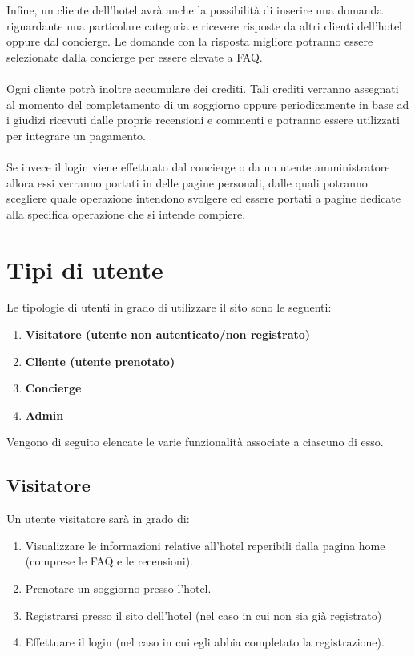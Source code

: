\documentclass [a4paper, 12pt]{book}
\begin{document}
Infine, un cliente dell'hotel avrà anche la possibilità di inserire una domanda riguardante una particolare categoria e ricevere risposte da altri clienti dell'hotel oppure dal concierge. Le domande con la risposta migliore potranno essere selezionate dalla concierge per essere elevate a FAQ.  \\\\
Ogni cliente potrà inoltre accumulare dei crediti. Tali crediti verranno assegnati al momento del completamento di un soggiorno oppure periodicamente in base ad i giudizi ricevuti dalle proprie recensioni e commenti e potranno essere utilizzati per integrare un pagamento.\\\\
Se invece il login viene effettuato dal concierge o da un utente amministratore allora essi verranno portati in delle pagine personali, dalle quali potranno scegliere quale operazione intendono svolgere ed essere portati a pagine dedicate alla specifica operazione che si intende compiere.

\medskip

\section{Tipi di utente}
Le tipologie di utenti in grado di utilizzare il sito sono le seguenti:
\begin{enumerate}
\item \textbf{Visitatore (utente non autenticato/non registrato)}
\item \textbf{Cliente (utente prenotato)}
\item \textbf{Concierge}
\item \textbf{Admin}
\end{enumerate}
Vengono di seguito elencate le varie funzionalità associate a ciascuno di esso.

\subsection{Visitatore}
Un utente visitatore sarà in grado di:
\begin{enumerate}
\item Visualizzare le informazioni relative all'hotel reperibili dalla pagina home (comprese le FAQ e le recensioni).
\item Prenotare un soggiorno presso l'hotel.
\item Registrarsi presso il sito dell'hotel (nel caso in cui non sia già registrato)
\item Effettuare il login (nel caso in cui egli abbia completato la registrazione).
\end{enumerate}
\end{document}
